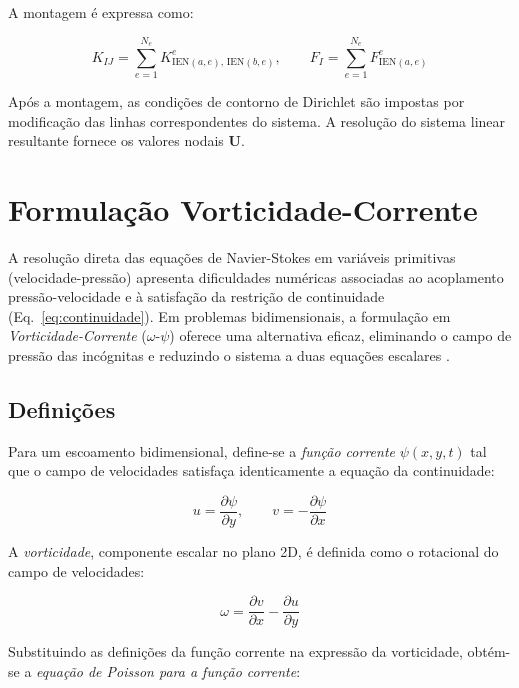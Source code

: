 A montagem é expressa como:

\begin{equation}
K_{IJ} = \sum_{e=1}^{N_e} K_{\text{IEN}(a,e), \, \text{IEN}(b,e)}^e, \qquad
F_I = \sum_{e=1}^{N_e} F_{\text{IEN}(a,e)}^e
\label{eq:assembly}
\end{equation}

Após a montagem, as condições de contorno de Dirichlet são impostas por modificação das linhas correspondentes do sistema. A resolução do sistema linear resultante fornece os valores nodais $\mathbf{U}$.

\section{Formulação Vorticidade-Corrente}
\label{sec:vorticidade_corrente}

A resolução direta das equações de Navier-Stokes em variáveis primitivas (velocidade-pressão) apresenta dificuldades numéricas associadas ao acoplamento pressão-velocidade e à satisfação da restrição de continuidade (Eq.~\ref{eq:continuidade}). Em problemas bidimensionais, a formulação em \textit{Vorticidade-Corrente} ($\omega$-$\psi$) oferece uma alternativa eficaz, eliminando o campo de pressão das incógnitas e reduzindo o sistema a duas equações escalares \cite{Maliska2004}.

\subsection{Definições}

Para um escoamento bidimensional, define-se a \textit{função corrente} $\psi(x,y,t)$ tal que o campo de velocidades satisfaça identicamente a equação da continuidade:

\begin{equation}
u = \frac{\partial \psi}{\partial y}, \qquad v = -\frac{\partial \psi}{\partial x}
\label{eq:funcao_corrente}
\end{equation}

A \textit{vorticidade}, componente escalar no plano 2D, é definida como o rotacional do campo de velocidades:

\begin{equation}
\omega = \frac{\partial v}{\partial x} - \frac{\partial u}{\partial y}
\label{eq:vorticidade_def}
\end{equation}

Substituindo as definições da função corrente na expressão da vorticidade, obtém-se a \textit{equação de Poisson para a função corrente}:

